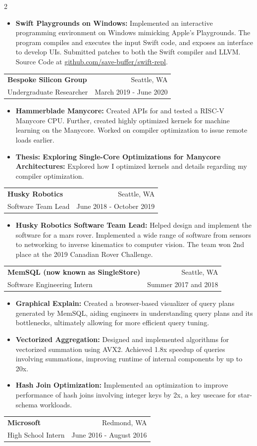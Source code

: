 \documentclass[letterpaper,11pt]{article}
\makeatletter
\newcommand{\resumeItem}[2]{
\vspace{-3pt}
\item\small{
    \textbf{#1}{\textbf{:} #2 \vspace{-2pt}}
  }
}
\newcommand{\resumeSubheading}[4]{
  \vspace{4pt}
  \begin{tabular*}{\textwidth}{l@{\extracolsep{\fill}}r}
    \textbf{#1} & #2 \\
    {\small#3} & {\small #4} \\
  \end{tabular*}\vspace{-5pt}
}
\newcommand{\resumeSubHeadingListEnd}{}
\newcommand{\resumeItemListStart}{\vspace{3pt}\begin{itemize}}
\newcommand{\resumeItemListEnd}{\end{itemize}\vspace{-5pt}}
\makeatother
\begin{document}
\begin{paracol}{2}
\begin{tcolorbox}[breakable]
\vspace{2pt}
\resumeItemListStart
\resumeItem{Swift Playgrounds on Windows}
{Implemented an interactive programming environment on Windows mimicking Apple's
  Playgrounds. The program compiles and executes the input Swift code, and exposes an
  interface to develop UIs. Submitted patches to both the Swift compiler
  and LLVM. Source Code at \href{https://www.github.com/save-buffer/swift-repl}
  {github.com/save-buffer/swift-repl}.}
\resumeItemListEnd
\vspace{2pt}
\resumeSubheading
{Bespoke Silicon Group}{Seattle, WA}
{Undergraduate Researcher}{March 2019 - June 2020}
\resumeItemListStart
\vspace{2pt}
\resumeItem{Hammerblade Manycore}
{Created APIs for and tested a RISC-V Manycore CPU. Further, created highly optimized kernels
  for machine learning on the Manycore. Worked on compiler optimization to issue remote
  loads earlier.}
\resumeItem{Thesis: Exploring Single-Core Optimizations for Manycore Architectures}{Explored
  how I optimized kernels and details regarding my compiler optimization.}
\resumeItemListEnd
\vspace{2pt}
\resumeSubheading
{Husky Robotics}{Seattle, WA}
{Software Team Lead}{June 2018 - October 2019}
\vspace{2pt}
\resumeItemListStart
\resumeItem{Husky Robotics Software Team Lead}
{Helped design and implement the software for a mars rover. Implemented a wide range of
  software from sensors to networking to inverse kinematics to computer vision.  The team
  won 2nd place at the 2019 Canadian Rover Challenge.}
\resumeItemListEnd
\vspace{2pt}
\resumeSubheading
{MemSQL (now known as SingleStore)}{Seattle, WA}
{Software Engineering Intern}{Summer 2017 and 2018}
\resumeItemListStart
\resumeItem{Graphical Explain}
{Created a browser-based visualizer of query plans generated by MemSQL, aiding
  engineers in understanding query plans and its bottlenecks, ultimately allowing for
  more efficient query tuning.}
\resumeItem{Vectorized Aggregation}
{Designed and implemented algorithms for vectorized summation using AVX2. Achieved 1.8x
  speedup of queries involving summations, improving runtime of internal components by up
  to 20x.}
\resumeItem{Hash Join Optimization}
{Implemented an optimization to improve performance of hash joins involving integer keys
  by 2x, a key usecase for star-schema workloads.}
\resumeItemListEnd
\resumeSubheading
{Microsoft}{Redmond, WA}
{High School Intern}{June 2016 - August 2016}
\resumeSubHeadingListEnd


\end{tcolorbox}
\end{paracol}
\end{document}
